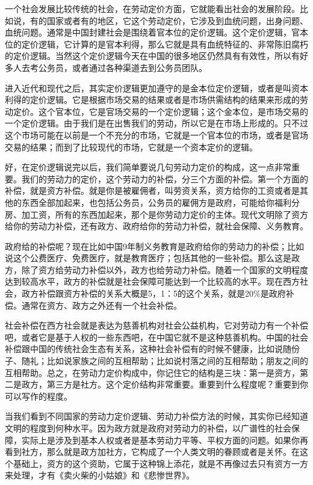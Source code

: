 \documentclass[UTF8, 12pt, a4paper]{ctexrep}
\begin{document}
一个社会发展比较传统的社会，在劳动定价方面，它就能看出社会的发展阶段。比如说，有的国家或者有的地区，它这个劳动定价，它涉及到血统问题，出身问题、血统问题。通常是中国封建社会是围绕着官本位的定价逻辑。这个定价逻辑，官本位的定价逻辑，它计算的是官本利得，那么它就是具有血统特征的、非常陈旧腐朽的定价逻辑。当然这个定价逻辑今天在中国的很多地区仍然具有有效性，所以有好多人去考公务员，或者通过各种渠道去到公务员团队。

进入近代和现代之后，其实定价逻辑更加遵守的是金本位定价逻辑，或者是叫资本利得的定价逻辑。它是根据市场交易的结果或者是市场供需结构的结果来形成的劳动定价。这个官本位，它是官场交易的一个定价逻辑；这个金本位，是市场交易的一个定价逻辑。由于我们是在出售我们的劳动，所以它是在市场上形成的。只不过这个市场可能在以前是一个不充分的市场，它就是一个官本位的市场，或者是官场交易的结果；而到了比较现代的市场，它就是一个资本定价的逻辑。

好，在定价逻辑说完以后，我们简单要说几句劳动力定价的构成，这一点非常重要。我们的劳动力的定价，这个劳动力的补偿，分三个方面的补偿。第一个方面的补偿，就是资方补偿。就是你是被雇佣者，叫劳资关系，资方给你的工资或者是其他的东西全部加起来，也包括公务员，公务员的雇佣方是政府，可能给你福利分房、加工资，所有的东西加起来，那个是你劳动力定价的主体。现代文明除了资方给你的劳动力补偿，还有政方、政府给你的劳动力补偿，就社会保障、义务教育。

政府给的补偿呢？现在比如中国9年制义务教育是政府给你的劳动力的补偿；比如说这个公费医疗、免费医疗，就是教育医疗；包括其他的一些补偿。那么这是政方，除了资方给劳动力补偿以外，政方也给劳动力补偿。随着一个国家的文明程度达到较高水平，政方的补偿就是社会保障可能达到一个比较高的水平。现在西方社会，政方补偿跟资方补偿的关系大概是5，1：5的这个关系，就是20\%是政府补偿。通常在资方、政方之外还有一个社会补偿。

社会补偿在西方社会就是表达为慈善机构对社会公益机构，它对劳动力有一个补偿吧，或者它是基于人权的一些东西吧，在中国它就不是这种慈善机构。中国的社会补偿跟中国的传统社会生态有关系，这种社会补偿有的时候不健康，比如说随份子、随礼；比如说家族之间的互相帮助；比如说村落之间的互相帮助；朋友之间的互相帮助。总之，在劳动力定价构成中，你记住它的结构是三块：第一是资方，第二是政方，第三方是社方。这个定价结构非常重要。重要到什么程度呢？重要到你可以写作的程度。

当我们看到不同国家的劳动力定价逻辑、劳动力补偿方法的时候，其实你已经知道文明的程度到何种水平。因为政方就是政府对劳动力的补偿，以广谱性的社会保障，实际上是涉及到基本人权或者是基本劳动力平等、平权方面的问题。如果你再看到社方，那么就是政方加社方，它构成了一个人类文明的眷顾或者是关怀。在这个基础上，资方的这个资助，它属于这种锦上添花，就是不再像过去只有资方一方来处理，才有《卖火柴的小姑娘》和《悲惨世界》。
\end{document}
